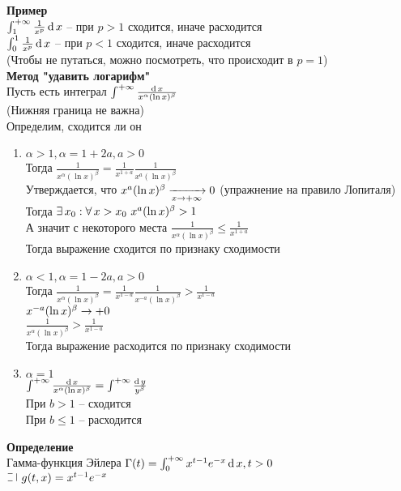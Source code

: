 \documentclass[12pt]{article}
\begin{document}
\textbf{Пример}\\
$\int_1^{+\infty} \frac1{x^p}\operatorname{d} x$ -- при $p>1$ сходится, иначе расходится\\
$\int_0^1 \frac1{x^p}\operatorname{d} x$ -- при $p<1$ сходится, иначе расходится\\
(Чтобы не путаться, можно посмотреть, что происходит в $p=1$)\\
\textbf{Метод "удавить логарифм"}\\
Пусть есть интеграл $\int^{+\infty} \frac{\operatorname{d} x}{x^\alpha(\ln x)^\beta}$\\
(Нижняя граница не важна)\\
Определим, сходится ли он
\begin{enumerate}
    \item $\alpha > 1, \alpha = 1 + 2a, a > 0$\\
    Тогда $\frac1{x^\alpha(\ln x)^\beta} = \frac1{x^{1+a}}\frac1{x^a(\ln x)^\beta}$\\
    Утверждается, что $x^a (\ln x)^\beta \xrightarrow[x\rightarrow +\infty]{} 0$ (упражнение на правило Лопиталя)\\
    Тогда $\exists\, x_0: \forall\, x > x_0 \ x^a(\ln x)^\beta > 1$\\
    А значит с некоторого места $\frac1{x^\alpha(\ln x)^\beta} \leq \frac1{x^{1+a}}$\\
    Тогда выражение сходится по признаку сходимости
    \item $\alpha < 1, \alpha = 1 - 2a, a > 0$\\
    Тогда $\frac1{x^\alpha(\ln x)^\beta} = \frac1{x^{1-a}}\frac1{x^{-a}(\ln x)^\beta} > \frac1{x^{1-a}}$\\
    $x^{-a}(\ln x)^\beta \rightarrow +0$\\
    $\frac1{x^\alpha(\ln x)^\beta} > \frac1{x^{1-a}}$\\
    Тогда выражение расходится по признаку сходимости
    \item $\alpha = 1$\\
    $\int^{+\infty} \frac{\operatorname{d} x}{x^\alpha(\ln x)^\beta} = \int^{+\infty}\frac{\operatorname{d} y}{y^\beta}$\\
    При $b > 1$ -- сходится\\
    При $b \leq 1$ -- расходится
\end{enumerate}
\textbf{Определение}\\
Гамма-функция Эйлера $\Gamma(t) = \int_0^{+\infty} x^{t-1}e^{-x}\operatorname{d} x, t > 0$\\
$\letus\ g(t,x) = x^{t-1}e^{-x}$
\end{document}
